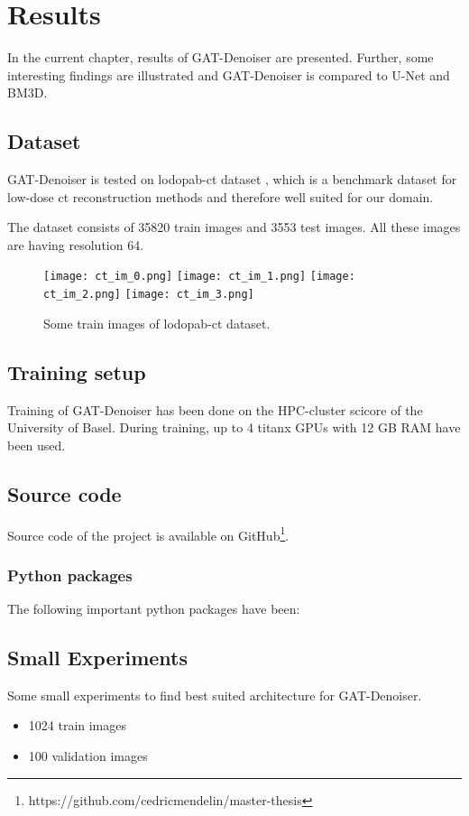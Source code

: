 \chapter{Results}
\label{sec:results}

In the current chapter, results of GAT-Denoiser are presented.
Further, some interesting findings are illustrated and GAT-Denoiser
is compared to U-Net and BM3D\cite{bm3d}.


\section{Dataset}
GAT-Denoiser is tested on lodopab-ct dataset \cite{lodopab-dataset}, which is a 
benchmark dataset for low-dose ct reconstruction methods and therefore well suited for our domain.

The dataset consists of 35820 train images and 3553 test images.
All these images are having resolution 64.

\begin{figure}[H]
  \centering
  \hfill
  \texttt{[image: ct\_im\_0.png]}
  \hfill
  \texttt{[image: ct\_im\_1.png]}
  \hfill
  \texttt{[image: ct\_im\_2.png]}
  \hfill
  \texttt{[image: ct\_im\_3.png]}
  \hfill
  \caption{Some train images of lodopab-ct dataset.}
\end{figure}



\section{Training setup}
Training of GAT-Denoiser has been done on the HPC-cluster scicore of the University of Basel.
During training, up to 4 titanx GPUs with 12 GB RAM have been used.


\section{Source code}
Source code of the project is available on GitHub\footnote{https://github.com/cedricmendelin/master-thesis}.

\subsection{Python packages}
The following important python packages have been:


\section{Small Experiments}
Some small experiments to find best suited architecture for GAT-Denoiser.
\begin{itemize}
  \item 1024 train images
  \item 100 validation images
\end{itemize}

